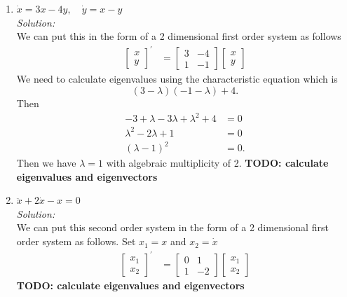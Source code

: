 \documentclass[10pt]{amsart}
\theoremstyle{nonumberplain}
\begin{document}
\begin{enumerate}[label={\bf {\arabic*}:}]
\begin{enumerate}
\item $\dot x = 3x - 4y, \quad \dot y = x - y$ \\
\textit{Solution:} \\
We can put this in the form of a 2 dimensional first order system as follows
\begin{align*}
\begin{bmatrix}
x \\ y
\end{bmatrix}^\prime
&= \begin{bmatrix}
3 & -4 \\
1 & -1
\end{bmatrix} \begin{bmatrix}
x \\ y
\end{bmatrix}
\end{align*}
We need to calculate eigenvalues using the characteristic equation which is 
$$(3 - \lambda)(-1 -\lambda) + 4.$$
Then
\begin{align*}
-3 + \lambda -3\lambda + \lambda^2 + 4 &= 0 \\
\lambda^2 -2\lambda + 1 &= 0 \\
(\lambda - 1)^2 &= 0.
\end{align*}
Then we have $\lambda = 1$ with algebraic multiplicity of 2.
\textbf{TODO: calculate eigenvalues and eigenvectors} \\

\item $\ddot x + 2\dot x - x = 0$ \\
\textit{Solution:} \\
We can put this second order system in the form of a 2 dimensional first order system as follows.
Set $x_1 = x$ and $x_2 = \dot x$
\begin{align*}
\begin{bmatrix}
x_1 \\ x_2
\end{bmatrix}^\prime
&= \begin{bmatrix}
0 & 1 \\
1 & -2
\end{bmatrix} \begin{bmatrix}
x_1 \\ x_2
\end{bmatrix}
\end{align*}
\textbf{TODO: calculate eigenvalues and eigenvectors} \\

\end{enumerate}


\end{enumerate}
\end{document}
